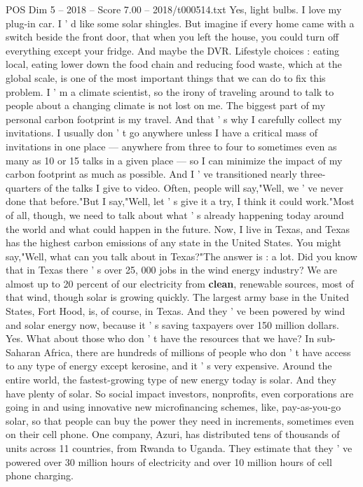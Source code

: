 \begin{textsample}{POS Dim 5 – 2018 – Score 7.00 – 2018/t000514.txt}
Yes, light bulbs.
I love my plug-in car.
I ' d like some solar shingles.
But imagine if every home came with a switch beside the front door, that when you left the house, you could turn off everything except your fridge.
And maybe the DVR.
Lifestyle choices : eating local, eating lower down the food chain and reducing food waste, which at the global scale, is one of the most important things that we can do to fix this problem.
I ' m a climate scientist, so the irony of traveling around to talk to people about a changing climate is not lost on me.
The biggest part of my personal carbon footprint is my travel.
And that ' s why I carefully collect my invitations.
I usually don ' t go anywhere unless I have a critical mass of invitations in one place — anywhere from three to four to sometimes even as many as 10 or 15 talks in a given place — so I can minimize the impact of my carbon footprint as much as possible.
And I ' ve transitioned nearly three-quarters of the talks I give to video.
Often, people will say,"Well, we ' ve never done that before."But I say,"Well, let ' s give it a try, I think it could work."Most of all, though, we need to talk about what ' s already happening today around the world and what could happen in the future.
Now, I live in Texas, and Texas has the highest carbon emissions of any state in the United States.
You might say,"Well, what can you talk about in Texas?"The answer is : a lot.
Did you know that in Texas there ' s over 25, 000 jobs in the wind energy industry?
We are almost up to 20 percent of our electricity from \textbf{clean}, renewable sources, most of that wind, though solar is growing quickly.
The largest army base in the United States, Fort Hood, is, of course, in Texas.
And they ' ve been powered by wind and solar energy now, because it ' s saving taxpayers over 150 million dollars.
Yes.
What about those who don ' t have the resources that we have?
In sub-Saharan Africa, there are hundreds of millions of people who don ' t have access to any type of energy except kerosine, and it ' s very expensive.
Around the entire world, the fastest-growing type of new energy today is solar.
And they have plenty of solar.
So social impact investors, nonprofits, even corporations are going in and using innovative new microfinancing schemes, like, pay-as-you-go solar, so that people can buy the power they need in increments, sometimes even on their cell phone.
One company, Azuri, has distributed tens of thousands of units across 11 countries, from Rwanda to Uganda.
They estimate that they ' ve powered over 30 million hours of electricity and over 10 million hours of cell phone charging.

\end{textsample}
